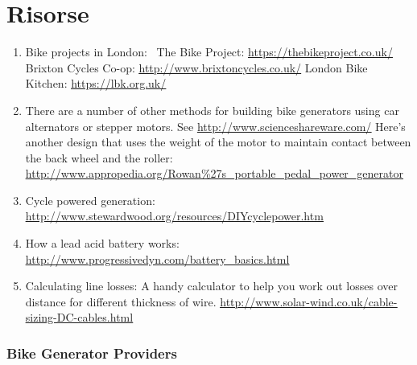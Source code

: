 \documentclass{article}
\theoremstyle{definition}
\theoremstyle{definition}
\theoremstyle{remark}
\begin{document}


{\color{blue}\section{Risorse}} %
\label{sec:risorse}

  \begin{enumerate}
    \item Bike projects in London:  \newline
      The Bike Project: \href{https://thebikeproject.co.uk/}{\underline{https://thebikeproject.co.uk/}} \newline
      Brixton Cycles Co-op: \href{http://www.brixtoncycles.co.uk/}{\underline{http://www.brixtoncycles.co.uk/}} \newline
      London Bike Kitchen: \href{https://lbk.org.uk/}{\underline{https://lbk.org.uk/}} \newline
    \item There are a number of other methods for building bike generators using car alternators or stepper motors. See \href{http://www.scienceshareware.com/}{\underline{http://www.scienceshareware.com/}} \newline
      Here’s another design that uses the weight of the motor to maintain contact between the back wheel and the roller: \href{http://www.appropedia.org/Rowan\%27s\_portable\_pedal\_power\_generator}{\underline{http://www.appropedia.org/Rowan\%27s\_portable\_pedal\_power\_generator}}
    \item Cycle powered generation: \href{http://www.stewardwood.org/resources/DIYcyclepower.htm}{\underline{http://www.stewardwood.org/resources/DIYcyclepower.htm}}
    \item How a lead acid battery works: \href{http://www.progressivedyn.com/battery_basics.html}{\underline{http://www.progressivedyn.com/battery\_basics.html}}
    \item Calculating line losses: A handy calculator to help you work out losses over distance for different thickness of wire. \href{http://www.solar-wind.co.uk/cable-sizing-DC-cables.html}{\underline{http://www.solar-wind.co.uk/cable-sizing-DC-cables.html}}
  \end{enumerate}

  \subsubsection{Bike Generator Providers} %
  \label{ssub:bike_generator_providers}
  
\end{document}
